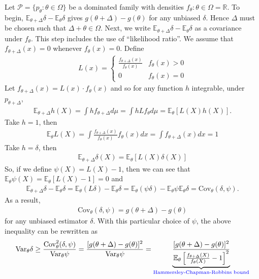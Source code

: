 Let $\mathcal{P}=\{p_\theta:\theta\in\Omega\}$ be a dominated family with densities $f_\theta:\theta\in\Omega=\mathbb{R}$.
To begin, $\mathbb{E}_{\theta+\Delta}\delta-\mathbb{E}_\theta\delta$ gives $g(\theta+\Delta)-g(\theta)$ for any unbiased $\delta$.
Hence $\Delta$ must be chosen such that $\Delta+\theta\in\Omega$.
Next, we write $\mathbb{E}_{\theta+\Delta}\delta-\mathbb{E}_\theta\delta$ as a covariance under $f_\theta$.
This step includes the use of ``likelihood ratio''.
We assume that $f_{\theta+\Delta}(x)=0$ whenever $f_\theta(x)=0$. Define
\begin{gather}
    L(x)=\left\{\begin{array}{ll}
        \frac{f_{\theta+\Delta}(x)}{f_\theta(x)} & f_\theta(x)>0 \\
        0 & f_\theta(x)=0
    \end{array}\right.
\end{gather}
Let $f_{\theta+\Delta}(x)=L(x)\cdot f_\theta(x)$ and so for any function $h$ integrable, under $p_{\theta+\Delta}$,
\begin{gather}
    \mathbb{E}_{\theta+\Delta}h(X)=\int{hf_{\theta+\Delta}}d\mu=\int{hLf_\theta}d\mu=\mathbb{E}_\theta[L(X)h(X)].
\end{gather}
Take $h=1$, then
\begin{gather}
    \mathbb{E}_\theta L(X)=\int{\frac{f_{\theta+\Delta}(x)}{f_\theta(x)}f_\theta(x)}dx=\int{f_{\theta+\Delta}(x)}dx=1
\end{gather}
Take $h=\delta$, then
\begin{gather}
    \mathbb{E}_{\theta+\Delta}\delta(X)=\mathbb{E}_\theta[L(X)\delta(X)]
\end{gather}
So, if we define $\psi(X)=L(X)-1$, 
then we can see that $\mathbb{E}_\theta\psi(X)=\mathbb{E}_\theta[L(X)-1]=0$ and 
\begin{gather}
    \mathbb{E}_{\theta+\Delta}\delta - \mathbb{E}_\theta\delta
    =\mathbb{E}_\theta(L\delta)-\mathbb{E}_\theta\delta
    =\mathbb{E}_\theta(\psi\delta)-\mathbb{E}_\theta\psi\mathbb{E}_\theta\delta
    =\mathrm{Cov}_\theta(\delta,\psi).
\end{gather}
As a result, 
\begin{gather}
    \mathrm{Cov}_\theta(\delta,\psi)=g(\theta+\Delta)-g(\theta)
\end{gather}
for any unbiased estimator $\delta$. With this particular choice of $\psi$,
the above inequality can be rewritten as 
\begin{gather}
    \mathrm{Var}_\theta\delta
    \geq \frac{\mathrm{Cov}_\theta^2(\delta,\psi)}{\mathrm{Var}_\theta\psi}
    = \frac{[g(\theta+\Delta)-g(\theta)]^2}{\mathrm{Var}_\theta\psi}
    =\underbrace{
    \frac{[g(\theta+\Delta)-g(\theta)]^2}
    {\mathbb{E}_\theta\left[\frac{f_{\theta+\Delta}(X)}{f_\theta(X)}-1\right]^2}
    }_{\color{blue}\text{Hammersley-Chapman-Robbins bound}}
\end{gather}
\newline

